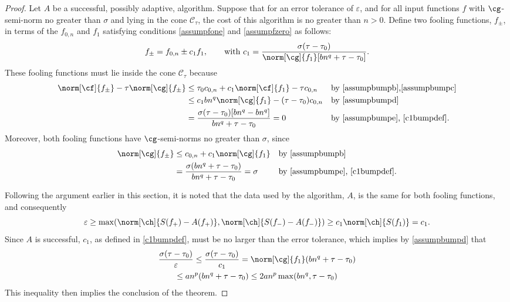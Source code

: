 \documentclass[final]{elsarticle}
\newcommand{\cc}{\mathcal{C}}
\theoremstyle{definition}
\theoremstyle{remark}
\begin{document}
\begin{proof} Let $A$ be a successful, possibly adaptive, algorithm.  Suppose that for an error tolerance of $\varepsilon$, and for all input functions $f$ with $\cg$-semi-norm no greater than $\sigma$ and lying in the cone  $\cc_{\tau}$, the cost of this algorithm is no greater than $n>0$.  Define two fooling functions, $f_{\pm}$, in terms of the $f_{0,n}$ and $f_1$ satisfying conditions \eqref{assumpfone} and \eqref{assumpfzero} as follows:
\begin{equation} \label{c1bumpdef}
f_{\pm} =f_{0,n} \pm c_1 f_1, \qquad \text{with } c_1= \frac{\sigma (\tau-\tau_0)}{\norm[\cg]{f_1} [b n^q + \tau - \tau_0]}.
\end{equation}
These fooling functions must lie inside the cone $\cc_{\tau}$ because
\begin{align*}
\norm[\cf]{f_{\pm}} - \tau  \norm[\cg]{f_{\pm}} & \le \tau_0 c_{0,n} + c_1 \norm[\cf]{f_1} - \tau c_{0,n}
&& \text{by \eqref{assumpbumpb},\eqref{assumpbumpc}} \\
& \le c_1 b n^{q} \norm[\cg]{f_1} - (\tau - \tau_0) c_{0,n} && \text{by \eqref{assumpbumpd}} \\
& = \frac{\sigma (\tau - \tau_0) [b n^q - b n^q ] }{b n^q + \tau - \tau_0} = 0 && \text{by \eqref{assumpbumpe}, \eqref{c1bumpdef}}.
\end{align*}
Moreover, both fooling functions have $\cg$-semi-norms no greater than $\sigma$, since
\begin{align*}
\norm[\cg]{f_{\pm}} & \le c_{0,n} + c_1 \norm[\cg]{f_1}
&& \text{by \eqref{assumpbumpb}} \\
& = \frac{\sigma(b n^q + \tau- \tau_0) }{b n^q + \tau- \tau_0} =\sigma && \text{by \eqref{assumpbumpe}, \eqref{c1bumpdef}.}
\end{align*}

Following the argument earlier in this section, it is noted that the data used by the algorithm, $A$, is the same for both fooling functions, and consequently 
\[
\varepsilon  \ge  \max(\norm[\ch]{S(f_+)-A(f_+)},\norm[\ch]{S(f_-)-A(f_-)}) \ge c_1 \norm[\ch]{S(f_1)}=c_1.
\]
Since $A$ is successful, $c_1$, as defined in \eqref{c1bumpdef}, must be no larger than the error tolerance, which implies by \eqref{assumpbumpd} that 
\begin{multline*}
\frac{\sigma (\tau-\tau_0)}{\varepsilon} \le \frac{\sigma (\tau-\tau_0)}{c_1}  = \norm[\cg]{f_1} (b n^q + \tau-\tau_0) \\
\le a n^{p} (b n^q + \tau-\tau_0) \le 2 a n^{p} \max( b n^{q}, \tau-\tau_0) 
\end{multline*}
This inequality then implies the conclusion of the theorem.   
\end{proof}
\end{document}
